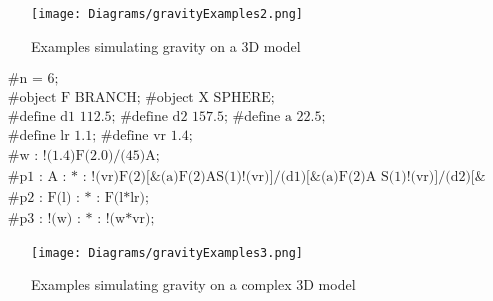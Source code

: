 \begin{figure}[htbp]
	{\centering
		\vspace{7px}
		\texttt{[image: Diagrams/gravityExamples2.png]}
		\label{3DAxisFigure} \label{Gravity applied to generated models}
		\caption{Examples simulating gravity on a 3D model}
	}
\end{figure}
\FloatBarrier

\begin{singlespace}
\begin{equation}
\begin{aligned}
	&\textrm{\#n = 6;} \\
	&\textrm{\#object F BRANCH; \#object X SPHERE;}\\
	&\textrm{\#define d1 112.5; \#define d2 157.5; \#define a 22.5;}\\
	&\textrm{\#define lr 1.1; \#define vr 1.4;}\\
	&\textrm{\#w : !(1.4)F(2.0)/(45)A;}\\
	&\textrm{\#p1 : A : * : !(vr)F(2)[\&(a)F(2)AS(1)!(vr)]/(d1)[\&(a)F(2)A S(1)!(vr)]/(d2)[\&(a)F(2)A S(1)!(vr);}\\
	&\textrm{\#p2 : F(l) : * : F(l*lr);}\\
	&\textrm{\#p3 : !(w) : * : !(w*vr);}
\end{aligned}
\end{equation}
\end{singlespace}

\begin{figure}[htbp]
	{\centering
		\vspace{7px}
		\texttt{[image: Diagrams/gravityExamples3.png]}
		\label{3DAxisFigure} \label{Gravity applied to generated models}
		\caption{Examples simulating gravity on a complex 3D model}
	}
\end{figure}
\FloatBarrier